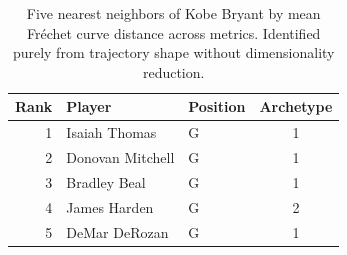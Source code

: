 \begin{table}[htbp]
  \centering\small
  \begin{tabular}{rllc}
    \toprule
    Rank & Player & Position & Archetype \\
    \midrule
    1 & Isaiah Thomas & G & 1 \\
    2 & Donovan Mitchell & G & 1 \\
    3 & Bradley Beal & G & 1 \\
    4 & James Harden & G & 2 \\
    5 & DeMar DeRozan & G & 1 \\
    \bottomrule
  \end{tabular}
  \caption{Five nearest neighbors of Kobe Bryant by mean Fr\'{e}chet curve distance across metrics. Identified purely from trajectory shape without dimensionality reduction.}
  \label{tab:Kobe_Bryant_frechet_curve_neighbors}
\end{table}

